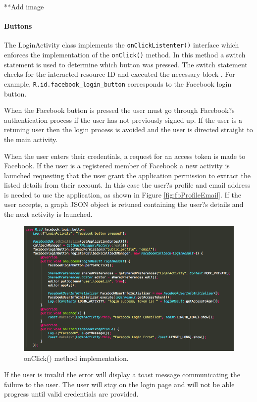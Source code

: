 \documentclass[a4paper, 11pt]{article}
\begin{document}
**Add image

\paragraph{Buttons}
The LoginActivity class implements the \texttt{onClickListenter()} interface which enforces the implementation of the \texttt{onClick()} method. In this method a switch statement is used to determine which button was pressed. The switch statement checks for the interacted resource ID and executed the necessary block . For example, \texttt{R.id.facebook\_login\_button} corresponds to the Facebook login button. 

When the Facebook button is pressed the  user must go through Facebook?s authentication process if the user has not previously signed up. If the user is a retuning user then the login process is avoided and the user is directed straight to the main activity.  

When the user enters their credentials, a request for an access token is made to Facebook. If the user is a registered member of Facebook a new activity is launched requesting that the user grant the application permission to extract the listed details from their account. In this case the user?s profile and email address is needed to use the application, as shown in Figure \ref{fig:fbProfileEmail}. If the user accepts, a graph JSON object is retuned containing the user?s details and the next activity is launched.

\begin{figure}[h]
\centering
\includegraphics[width=\textwidth]{fbProfileEmail}
\caption{onClick() method implementation.}
\end{figure}

If the user is invalid the error will display a toast message communicating the failure to the user. The user will stay on the login page and will not be able progress until valid credentials are provided. 
\end{document}
